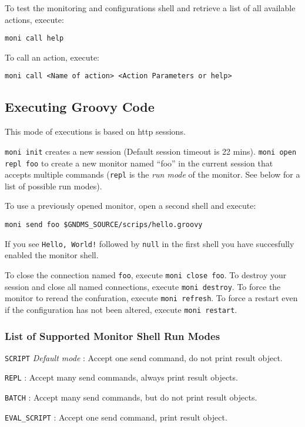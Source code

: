 \documentclass{article}
\begin{document}
To test the monitoring and configurations shell and retrieve a list
of all available actions, execute:

\begin{verbatim}
moni call help
\end{verbatim}
To call an action, execute:

\begin{verbatim}
moni call <Name of action> <Action Parameters or help>
\end{verbatim}
\subsection{Executing Groovy Code}

This mode of executions is based on http sessions.

\verb!moni init! creates a new session (Default session timeout is
22 mins). \verb!moni open repl foo! to create a new monitor named
``foo'' in the current session that accepts multiple commands
(\verb!repl! is the \emph{run mode} of the monitor. See below for a
list of possible run modes).

To use a previously opened monitor, open a second shell and
execute:

\begin{verbatim}
moni send foo $GNDMS_SOURCE/scrips/hello.groovy
\end{verbatim}
If you see \verb"Hello, World!" followed by \verb!null! in the
first shell you have succesfully enabled the monitor shell.

To close the connection named \verb!foo!, execute
\verb!moni close foo!. To destroy your session and close all named
connections, execute \verb!moni destroy!. To force the monitor to
reread the confuration, execute \verb!moni refresh!. To force a
restart even if the configuration has not been altered, execute
\verb!moni restart!.

\subsubsection{List of Supported Monitor Shell Run Modes}

\verb!SCRIPT! \emph{Default mode} : Accept one send command, do not
print result object.

\verb!REPL! : Accept many send commands, always print result
objects.

\verb!BATCH! : Accept many send commands, but do not print result
objects.

\verb!EVAL_SCRIPT! : Accept one send command, print result object.
\end{document}
